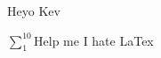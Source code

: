 \documentclass[twoside,11pt]{article}
\begin{document}
	Heyo Kev
	
	$\sum_{1}^{10}$Help me I hate LaTex
\end{document}
